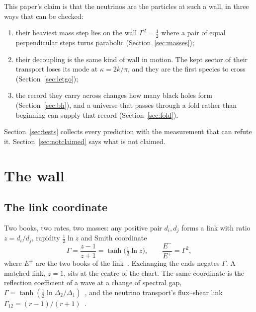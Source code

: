 \documentclass[11pt]{article}
\theoremstyle{definition}\newtheorem{hypothesis}{Hypothesis}\newtheorem{prediction}{Prediction}
\theoremstyle{remark}\newtheorem{remark}[theorem]{Remark}
\begin{document}
This paper's claim is that the neutrinos are the particles at such a wall, in three ways that can be checked:
\begin{enumerate}[nosep]
\item their heaviest mass step lies on the wall $\Gamma^2=\tfrac12$ where a pair of equal perpendicular steps turns parabolic (Section~\ref{sec:masses});
\item their decoupling is the same kind of wall in motion. The kept sector of their transport loses its mode at $\kappa=2k/\pi$, and they are the first species to cross (Section~\ref{sec:letgo});
\item the record they carry across changes how many black holes form (Section~\ref{sec:bh}), and a universe that passes through a fold rather than beginning can supply that record (Section~\ref{sec:fold}).
\end{enumerate}
Section~\ref{sec:tests} collects every prediction with the measurement that can refute it. Section~\ref{sec:notclaimed} says what is not claimed.

\section{The wall}\label{sec:wall}

\subsection{The link coordinate}
Two books, two rates, two masses: any positive pair $d_i,d_j$ forms a link with ratio $z=d_i/d_j$, rapidity $\tfrac12\ln z$ and Smith coordinate
\begin{equation}
\Gamma=\frac{z-1}{z+1}=\tanh\big(\tfrac12\ln z\big),\qquad \frac{E^-}{E^+}=\Gamma^2 ,
\end{equation}
where $E^\mp$ are the two books of the link~\cite{VOTKP,Atlas}. Exchanging the ends negates $\Gamma$. A matched link, $z=1$, sits at the centre of the chart. The same coordinate is the reflection coefficient of a wave at a change of spectral gap, $\Gamma=\tanh(\tfrac12\ln\Delta_2/\Delta_1)$~\cite{BH}, and the neutrino transport's flux--shear link $\Gamma_{12}=(r-1)/(r+1)$~\cite{NU10}.
\end{document}
